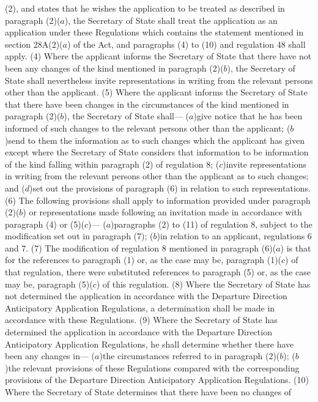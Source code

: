 \documentclass[a4paper]{article}
\begin{document}
(2), and states that he wishes the application to be treated as described in
paragraph (2)($a$), the Secretary of State shall treat the application as an
application under these Regulations which contains the statement mentioned in
section 28A(2)($a$) of the Act, and paragraphs (4) to (10) and regulation 48 shall
apply.
(4) Where the applicant informs the Secretary of State that there have not been
any changes of the kind mentioned in paragraph (2)($b$), the Secretary of State
shall nevertheless invite representations in writing from the relevant persons
other than the applicant.
(5) Where the applicant informs the Secretary of State that there have been
changes in the circumstances of the kind mentioned in paragraph (2)($b$), the
Secretary of State shall—
($a$)give notice that he has been informed of such changes to the relevant persons
other than the applicant;
($b$)send to them the information as to such changes which the applicant has given
except where the Secretary of State considers that information to be information
of the kind falling within paragraph (2) of regulation 8;
($c$)invite representations in writing from the relevant persons other than the
applicant as to such changes; and
($d$)set out the provisions of paragraph (6) in relation to such representations.
(6) The following provisions shall apply to information provided under paragraph
(2)($b$) or representations made following an invitation made in accordance with
paragraph (4) or (5)($c$)—
($a$)paragraphs (2) to (11) of regulation 8, subject to the modification set out
in paragraph (7);
($b$)in relation to an applicant, regulations 6 and 7.
(7) The modification of regulation 8 mentioned in paragraph (6)($a$) is that for
the references to paragraph (1) or, as the case may be, paragraph (1)($c$) of that
regulation, there were substituted references to paragraph (5) or, as the case
may be, paragraph (5)($c$) of this regulation.
(8) Where the Secretary of State has not determined the application in
accordance with the Departure Direction Anticipatory Application Regulations, a
determination shall be made in accordance with these Regulations.
(9) Where the Secretary of State has determined the application in accordance
with the Departure Direction Anticipatory Application Regulations, he shall
determine whether there have been any changes in—
($a$)the circumstances referred to in paragraph (2)($b$);
($b$)the relevant provisions of these Regulations compared with the corresponding
provisions of the Departure Direction Anticipatory Application Regulations.
(10) Where the Secretary of State determines that there have been no changes of
\end{document}
